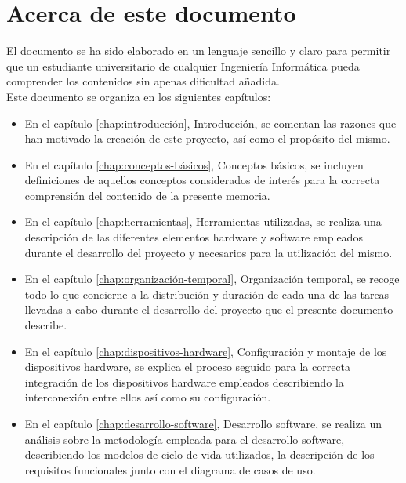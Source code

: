 \section{Acerca de este documento}

El documento se ha sido elaborado en un lenguaje sencillo y claro para permitir que un estudiante universitario de cualquier Ingeniería Informática pueda comprender los contenidos sin apenas dificultad añadida.\\

Este documento se organiza en los siguientes capítulos:\\

\begin{itemize}

\item En el capítulo \ref{chap:introducción}, Introducción, se comentan las razones que han motivado la creación de este proyecto, así como el propósito del mismo.

\item En el capítulo \ref{chap:conceptos-básicos}, Conceptos básicos, se incluyen definiciones de aquellos conceptos considerados de interés para la correcta comprensión del contenido de la presente memoria.

\item En el capítulo \ref{chap:herramientas}, Herramientas utilizadas, se realiza una descripción de las diferentes elementos hardware y software empleados durante el desarrollo del proyecto y necesarios para la utilización del mismo.

\item En el capítulo \ref{chap:organización-temporal}, Organización temporal, se recoge todo lo que concierne a la distribución y duración de cada una de las tareas llevadas a cabo durante el desarrollo del proyecto que el presente documento describe.

\item En el capítulo \ref{chap:dispositivos-hardware}, Configuración y montaje de los dispositivos hardware, se explica el proceso seguido para la correcta integración de los dispositivos hardware empleados describiendo la interconexión entre ellos así como su configuración. 

\item En el capítulo \ref{chap:desarrollo-software}, Desarrollo software, se realiza un análisis sobre la metodología empleada para el desarrollo software, describiendo los modelos de ciclo de vida utilizados, la descripción de los requisitos funcionales junto con el diagrama de casos de uso.


\end{itemize}
